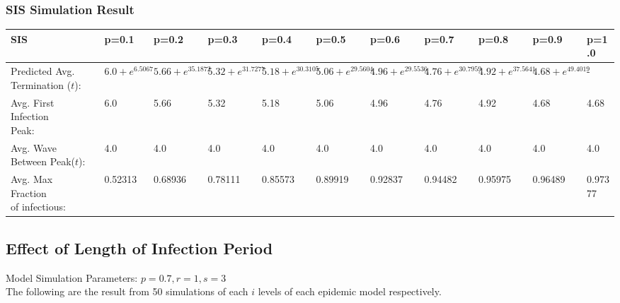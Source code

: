 \documentclass{subfile}
\begin{document}
  \subsubsection{SIS Simulation Result}
  {
  \small
  \begin{adjustbox}{max width=1.2\textwidth,center}
  \begin{tabular}{|l|l|l|l|l|l|l|l|l|l|l|}
    \hline
    SIS & p=0.1 & p=0.2 & p=0.3 & p=0.4 & p=0.5 & p=0.6 & p=0.7 & p=0.8 & p=0.9 & p=1.0\\
    \hline
    \makecell{Predicted\\Avg.\\Termination\\(\(t\)):} & \(6.0 + e^{6.5067}\) & \(5.66 + e^{35.1872}\) & \(5.32 + e^{31.7277}\) & \(5.18 + e^{30.3105}\) & \(5.06 + e^{29.5604}\) & \(4.96 + e^{29.5536}\) & \(4.76 + e^{30.7959}\) & \(4.92 + e^{37.5641}\) & \(4.68 + e^{49.4019}\) & -\footnotemark\\
    \hline
    \makecell{Avg. First\\Infection\\Peak:} & 6.0& 5.66& 5.32& 5.18& 5.06& 4.96& 4.76& 4.92& 4.68& 4.68\\
    \hline
    \makecell{Avg. Wave\\Between Peak(\(t\)):} & 4.0 & 4.0 & 4.0 & 4.0 & 4.0 & 4.0 & 4.0 & 4.0 & 4.0 & 4.0\\
    \hline
    \makecell{Avg. Max\\Fraction\\of infectious:} & 0.52313 & 0.68936 & 0.78111 & 0.85573 & 0.89919 & 0.92837 & 0.94482 & 0.95975 & 0.96489 & 0.97377\\
    \hline
  \end{tabular}
  \end{adjustbox}}

  \subsection{Effect of Length of Infection Period}
  Model Simulation Parameters: \(p=0.7, r=1, s=3\)\\
  The following are the result from 50 simulations of each \(i\) levels of each epidemic model respectively.
\end{document}
